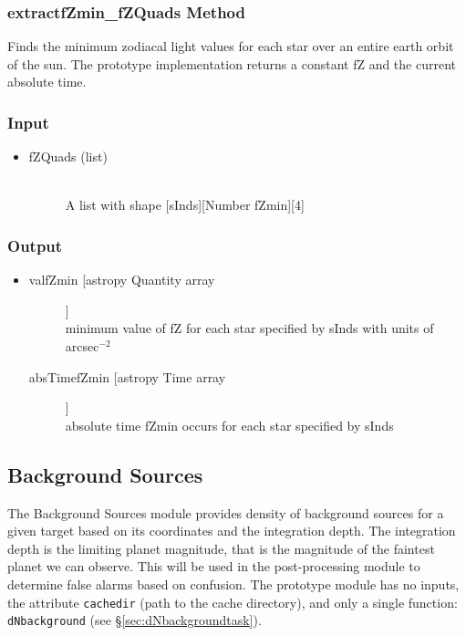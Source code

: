 \documentclass[cleanfoot]{asme2ej}
\begin{document}
\subsubsection{extractfZmin\_fZQuads Method} \label{sec:extractfZmin_fZQuadstask}
Finds the minimum zodiacal light values for each star over an entire earth orbit of the sun. The prototype implementation returns a constant fZ and the current absolute time.
\subsubsection*{Input}
\begin{itemize}
\item
\begin{description}
    \item[fZQuads (list)] \hfill \\ A list with shape [sInds][Number fZmin][4]
\end{description}
\end{itemize}
\subsubsection*{Output}
\begin{itemize}
\item
\begin{description}
    \item[valfZmin [astropy Quantity array]] \hfill \\ minimum value of fZ for each star specified by sInds with units of arcsec$^{-2}$
    \item[absTimefZmin [astropy Time array]] \hfill \\ absolute time fZmin occurs for each star specified by sInds
\end{description}
\end{itemize}



\subsection{Background Sources}\label{sec:backgroundsources}

The Background Sources module provides density of background sources for a given target based on its coordinates and the integration depth. The integration depth is the limiting planet magnitude, that is the magnitude of the faintest planet we can observe. This will be used in the post-processing module to determine false alarms based on confusion.  The prototype module has no inputs, the attribute \texttt{cachedir} (path to the cache directory), and only a single function: \verb+dNbackground+ (see \S\ref{sec:dNbackgroundtask}).
\end{document}

